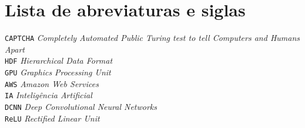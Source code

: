 
\chapter*{Lista de abreviaturas e siglas}

\noindent
\verb"CAPTCHA" \dotfill \textit{Completely Automated Public Turing
  test to tell Computers and Humans Apart}\\
\verb"HDF" \dotfill \textit{Hierarchical Data Format}\\
\verb"GPU" \dotfill \textit{Graphics Processing Unit}\\
\verb"AWS" \dotfill \textit{Amazon Web Services}\\
\verb"IA" \dotfill \textit{Inteligência Artificial}\\
\verb"DCNN" \dotfill \textit{Deep Convolutional Neural Networks}\\
\verb"ReLU" \dotfill \textit{Rectified Linear Unit}\\